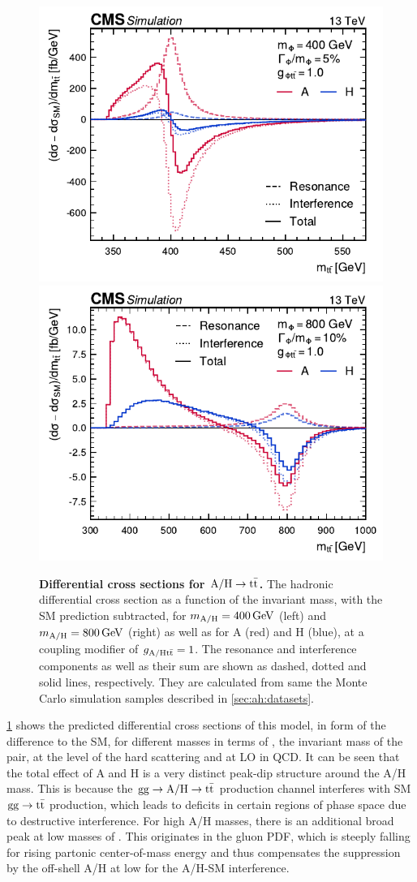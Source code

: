 \begin{figure}[ht!]
    \centering
    \includegraphics[width=0.49\linewidth]{figures/ah/ah_xs/ahspectrum_400.pdf}
    \hfill
    \includegraphics[width=0.49\linewidth]{figures/ah/ah_xs/ahspectrum_800.pdf}
    \caption{\textbf{Differential cross sections for $\mathrm{A/H} \rightarrow \mathrm{t \bar{t}}$.} The hadronic differential cross section as a function of the invariant \ttbar mass, with the SM prediction subtracted, for $m_{\mathrm{A/H}} = \SI{400}{GeV}$ (left) and $\mAH= \SI{800}{\GeV}$ (right) as well as for A (red) and H (blue), at a coupling modifier of $g_{\mathrm{A/H t \bar{t}}} = 1$. The resonance and interference components as well as their sum are shown as dashed, dotted and solid lines, respectively. They are calculated from same the Monte Carlo simulation samples described in \cref{sec:ah:datasets}.}
    \label{fig:theory:ahxs}
\end{figure}

\cref{fig:theory:ahxs} shows the predicted differential cross sections of this model, in form of the difference to the SM, for different masses in terms of \mtt, the invariant mass of the \ttbar pair, at the level of the hard scattering and at LO in QCD. It can be seen that the total effect of A and H is a very distinct peak-dip structure around the A/H mass. This is because the $\mathrm{gg \rightarrow A/H \rightarrow \mathrm{t \bar{t}}}$ production channel interferes with SM $\mathrm{gg \rightarrow \mathrm{t \bar{t}}}$ production, which leads to deficits in certain regions of phase space due to destructive interference. For high A/H masses, there is an additional broad peak at low masses of \mtt. This originates in the gluon PDF, which is steeply falling for rising partonic center-of-mass energy and thus compensates the suppression by the off-shell A/H at low \mtt for the A/H-SM interference.

